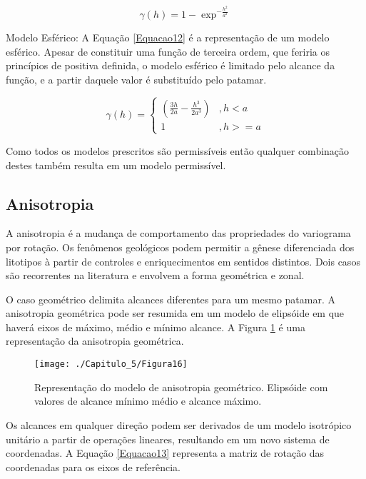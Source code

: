 \begin{equation}\label{Equacao11}
\gamma(h) = 1 - \exp^{-\frac{h^2}{a^2}}
\end{equation}

Modelo Esférico: A Equação \ref{Equacao12} é a representação de um modelo esférico. Apesar de constituir uma função de terceira ordem, que feriria os princípios de positiva definida, o modelo esférico é limitado pelo alcance da função, e a partir daquele valor é substituído pelo patamar. 

\begin{equation}\label{Equacao12}
\gamma(h) = \begin{cases}
\left( \frac{3h}{2a} - \frac{h^3}{2a^3} \right)  &, h < a \\
1 & , h >= a
\end{cases}
\end{equation}

Como todos os modelos prescritos são permissíveis então qualquer combinação destes também resulta em um modelo permissível. 

\subsection{Anisotropia}

A anisotropia é a mudança de comportamento das propriedades do variograma por rotação. Os fenômenos geológicos podem permitir a gênese diferenciada dos litotipos à partir de controles e enriquecimentos em sentidos distintos. Dois casos são recorrentes na literatura e envolvem a forma geométrica e zonal. 

O caso geométrico delimita alcances diferentes para um mesmo patamar. A anisotropia geométrica pode ser resumida em um modelo de elipsóide em que haverá eixos de máximo, médio e mínimo alcance. A Figura \ref{Figura16} é uma representação da anisotropia geométrica.

\begin{figure}[H]
	\centering
	\texttt{[image: ./Capitulo\_5/Figura16]}
	\caption{Representação do modelo de anisotropia geométrico. Elipsóide com valores de alcance mínimo médio e alcance máximo.}
	\label{Figura16}
\end{figure}

Os alcances em qualquer direção podem ser derivados de um modelo isotrópico unitário a partir de operações lineares, resultando em um novo sistema de coordenadas. A Equação \ref{Equacao13} representa a matriz de rotação das coordenadas para os eixos de referência.

